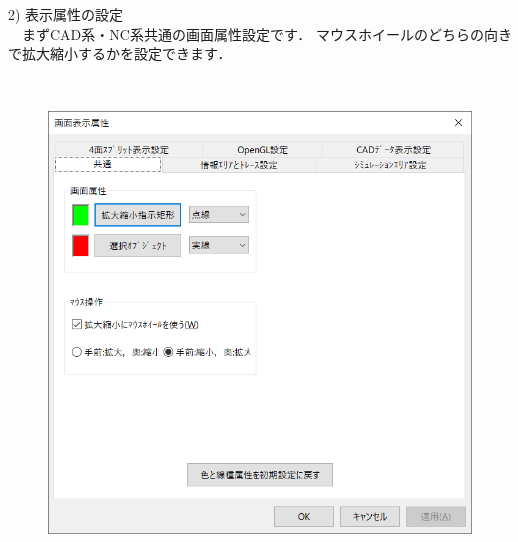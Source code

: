 \begin{minipage}[t]{0.38\textwidth}
2) 表示属性の設定\label{sec:gamen}\\
　まずCAD系・NC系共通の画面属性設定です．
マウスホイールのどちらの向きで拡大縮小するかを設定できます．
\end{minipage}
\begin{minipage}[t]{0.02\textwidth}
　
\end{minipage}
\begin{minipage}[t]{0.6\textwidth}
\vspace*{-2zh}
\begin{figure}[H]
\centering
\includegraphics[width=\textwidth]{No6/fig/disp1.png}
\label{fig:disp1.png}
\end{figure}
\end{minipage}

